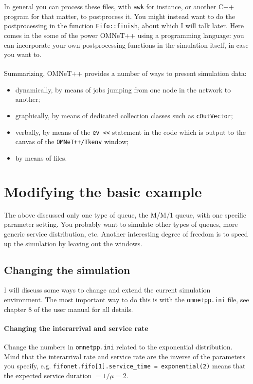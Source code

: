 \documentclass[a4paper]{article}
\begin{document}
In general you can process these files, with \texttt{awk} for instance,
or another C++ program for that matter, to postprocess it. You might
instead want to do the postprocessing  in the function
\texttt{Fifo::finish}, about which I will talk later. Here comes in
the some of the power    OMNeT++ using  a programming language:
you can incorporate your own postprocessing functions in the
simulation itself, in case you want to.

\paragraph{}
Summarizing, OMNeT++ provides a number of ways to present simulation
data:
\begin{itemize}
\item dynamically, by means of jobs jumping from one node in the
  network to another;
\item graphically, by means of dedicated collection classes such as
  \texttt{cOutVector};
\item verbally, by means of the \texttt{ev <<} statement in the code
  which is output to the  canvas of the \texttt{OMNeT++/Tkenv} window;
\item by means of files.
\end{itemize}

\section{Modifying the basic example}
\label{sec:next-steps}
The above discussed only one type of queue, the M/M/1 queue, with one
specific parameter setting. You
probably want to simulate other types of queues, more generic service
distribution, etc. Another interesting degree of freedom is to speed
up the simulation by leaving out the windows.

\subsection{Changing the  simulation}
\label{sec:changing-basic-mm1}
I will discuss some ways to change and extend the current simulation
environment. The most important way to do this is with the
\texttt{omnetpp.ini} file, see chapter 8 of the user manual for all details.


\paragraph{Changing the interarrival and service rate}
\label{sec:chang-inter-serv}
Change the numbers in \texttt{omnetpp.ini} related to the exponential
distribution. Mind that the interarrival rate and service rate are the
inverse of the parameters you specify, e.g.
\texttt{fifonet.fifo[1].service\_time = exponential(2)} means that the
expected service duration $ = 1/\mu = 2$.
\end{document}
